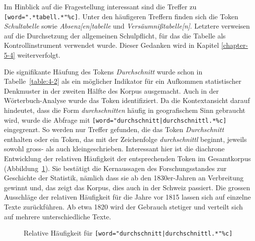 Im Hinblick auf die Fragestellung interessant sind die Treffer zu \texttt{[word=".*tabell.*"\%c]}. Unter den häufigeren Treffern finden sich die Token \textit{Schultabelle} sowie \textit{Absenz[en]tabelle} und \textit{Versäumnißtabelle[n]}. Letztere verweisen auf die Durchsetzung der allgemeinen Schulpflicht, für das die Tabelle als Kontrollinstrument verwendet wurde. Dieser Gedanken wird in Kapitel \ref{chapter-5-4} weiterverfolgt.

Die signifikante Häufung des Tokens \textit{Durchschnitt} wurde schon in Tabelle~\ref{table:4-2} als ein möglicher Indikator für ein Aufkommen statistischer Denkmuster in der zweiten Hälfte des Korpus ausgemacht. Auch in der Wörterbuch-Analyse wurde das Token identifiziert. Da die Kontextansicht darauf hindeutet, dass die Form \textit{durchschnitten} häufig in geografischem Sinn gebraucht wird, wurde die Abfrage mit \texttt{[word="durch\-schnitt|\-durch\-schnittl.*\%c]} eingegrenzt. So werden nur Treffer gefunden, die das Token \textit{Durchschnitt} enthalten oder ein Token, das mit der Zeichenfolge \textit{durchschnittl} beginnt, jeweils sowohl gross- als auch kleingeschrieben. Interessant hier ist die diachrone Entwicklung der relativen Häufigkeit der entsprechenden Token im Gesamtkorpus (Abbildung~\ref{figure:4-1}). Sie bestätigt die Kernaussagen des Forschungsstandes zur Geschichte der Statistik, nämlich dass sie ab den 1830er-Jahren an Verbreitung gewinnt und, das zeigt das Korpus, dies auch in der Schweiz passiert. Die grossen Ausschläge der relativen Häufigkeit für die Jahre vor 1815 lassen sich auf einzelne Texte zurückführen. Ab etwa 1820 wird der Gebrauch stetiger und verteilt sich auf mehrere unterschiedliche Texte.

\hspace{1cm}

\begin{figure}[!ht]
    \caption{Relative Häufigkeit für \texttt{[word="durch\-schnitt|\-durch\-schnittl.*"\%c]}}
    \label{figure:4-1} 
\end{figure}


